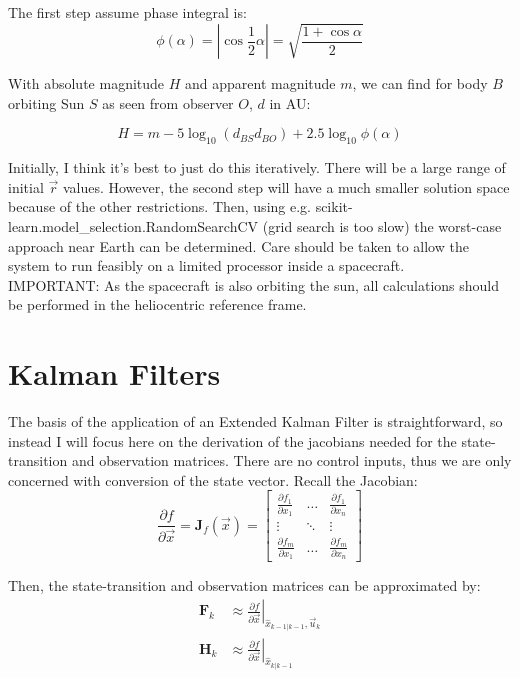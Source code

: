\documentclass[a4paper,10pt]{article}
\begin{document}
The first step assume phase integral is:
\begin{equation}
 \phi(\alpha) = |\cos{\frac{1}{2}\alpha}| = \sqrt{\frac{1+\cos \alpha}{2}}
 \label{eq:phase}
\end{equation}


With absolute magnitude $H$ and apparent magnitude $m$, we can find for body $B$ orbiting Sun $S$ as seen from observer $O$, $d$ in AU:

\begin{equation}
 H = m - 5 \log _{10} \left(d_{BS}d_{BO}\right) + 2.5\log _{10} \phi(\alpha)
\end{equation}

Initially, I think it's best to just do this iteratively. There will be a large range of initial $\vec{r}$ values. However, the second step will have a much smaller solution space because of the other restrictions. Then, using e.g. scikit-learn.model\_selection.RandomSearchCV (grid search is too slow) the worst-case approach near Earth can be determined. Care should be taken to allow the system to run feasibly on a limited processor inside a spacecraft.\\

IMPORTANT: As the spacecraft is also orbiting the sun, all calculations should be performed in the heliocentric reference frame.

\section{Kalman Filters}

The basis of the application of an Extended Kalman Filter is straightforward, so instead I will focus here on the derivation of the jacobians needed for the state-transition and observation matrices. There are no control inputs, thus we are only concerned with conversion of the state vector. Recall the Jacobian:
\begin{equation}
 \frac{\partial f}{\partial \vec{x}} = \mathbf{J}_f(\vec{x}) =
 \begin{bmatrix}
  \frac{\partial f_1}{\partial x_1} & \hdots & \frac{\partial f_1}{\partial x_n} \\
  \vdots & \ddots & \vdots \\
  \frac{\partial f_m}{\partial x_1} & \hdots & \frac{\partial f_m}{\partial x_n}
 \end{bmatrix}
\end{equation}

Then, the state-transition and observation matrices can be approximated by:
\begin{align}
 \mathbf{F}_k &\approx \left. \frac{\partial f}{\partial \vec{x}} \right|_{\hat{x}_{k-1|k-1},\vec{u}_k} \\
 \mathbf{H}_k &\approx \left. \frac{\partial f}{\partial \vec{x}} \right|_{\hat{x}_{k|k-1}}
\end{align}
\end{document}
